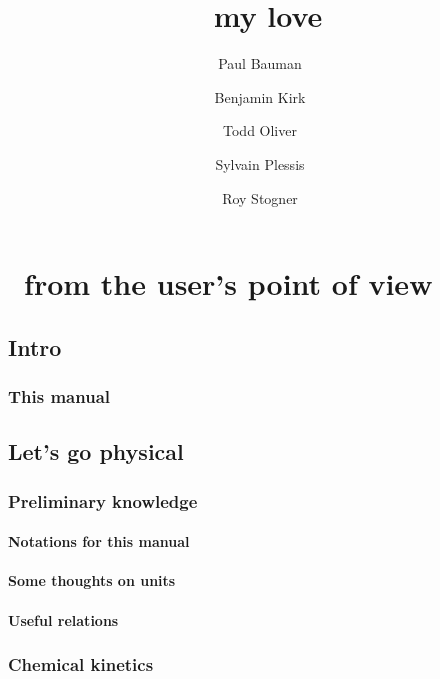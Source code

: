 \documentclass[twoside]{report}
\begin{document}
\title{\Antioch\ my love}
\date{\theversion}
\author{Paul Bauman \and Benjamin Kirk \and Todd Oliver \and Sylvain Plessis \and Roy Stogner}

\maketitle
\tableofcontents
\listoffigures
\listoftables



\part{\Antioch\ from the user's point of view}
\chapter{Intro}

\section{This manual}


\chapter{Let's go physical}
\chaptermark{\ANTIOCHPhys}
\label{Antioch:physics}

\section{Preliminary knowledge}

\subsection{Notations for this manual}


\subsection{Some thoughts on units}
\label{units_in_Antioch}


\subsection{Useful relations}
\label{relations}


\section{Chemical kinetics}
\end{document}

